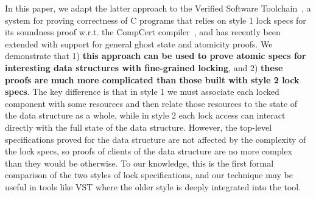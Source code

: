 In this paper, we adapt the latter approach to the Verified Software Toolchain~\cite{plfcc}, a system for proving correctness of C programs that relies on style 1 lock specs for its soundness proof w.r.t. the CompCert compiler~\cite{compcert}, and has recently been extended with support for general ghost state and atomicity proofs. We demonstrate that 1) \textbf{this approach can be used to prove atomic specs for interesting data structures with fine-grained locking}, and 2) \textbf{these proofs are much more complicated than those built with style 2 lock specs}. The key difference is that in style 1 we must associate each locked component with some resources and then relate those resources to the state of the data structure as a whole, while in style 2 each lock access can interact directly with the full state of the data structure. However, the top-level specifications proved for the data structure are not affected by the complexity of the lock specs, so proofs of clients of the data structure are no more complex than they would be otherwise. To our knowledge, this is the first formal comparison of the two styles of lock specifications, and our technique may be useful in tools like VST where the older style is deeply integrated into the tool.


